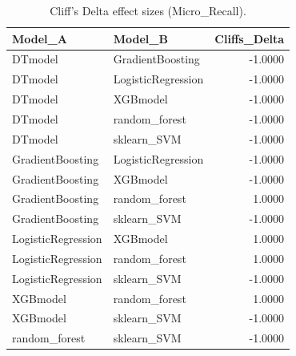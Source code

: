 \begin{table}[t]
\centering
\begin{tabular}{llr}
\toprule
Model_A & Model_B & Cliffs_Delta \\
\midrule
DTmodel & GradientBoosting & -1.0000 \\
DTmodel & LogisticRegression & -1.0000 \\
DTmodel & XGBmodel & -1.0000 \\
DTmodel & random_forest & -1.0000 \\
DTmodel & sklearn_SVM & -1.0000 \\
GradientBoosting & LogisticRegression & -1.0000 \\
GradientBoosting & XGBmodel & -1.0000 \\
GradientBoosting & random_forest & 1.0000 \\
GradientBoosting & sklearn_SVM & -1.0000 \\
LogisticRegression & XGBmodel & 1.0000 \\
LogisticRegression & random_forest & 1.0000 \\
LogisticRegression & sklearn_SVM & -1.0000 \\
XGBmodel & random_forest & 1.0000 \\
XGBmodel & sklearn_SVM & -1.0000 \\
random_forest & sklearn_SVM & -1.0000 \\
\bottomrule
\end{tabular}
\caption{Cliff's Delta effect sizes (Micro_Recall).}
\label{tab:cliffs_Micro_Recall}
\end{table}